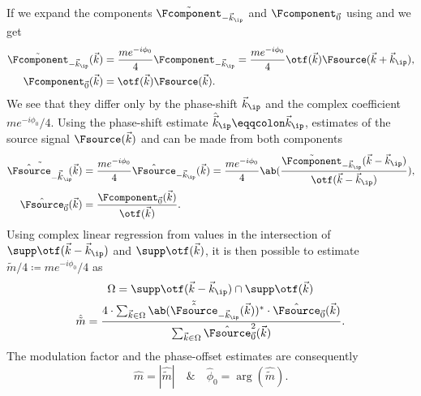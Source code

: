If we expand the components \(\tilde{\Fcomponent}_{-\vec{k}_\ip}\) and \(\Fcomponent_{\vec{0}}\) using 
     and  we get
    \begin{align*}
        \tilde{\Fcomponent}_{-\vec{k}_\ip}(\vec{k}) &= \frac{m e^{-i\phi_0}}{4} \Fcomponent_{-\vec{k}_\ip} 
            = \frac{m e^{-i\phi_0}}{4} \otf(\vec{k}) \Fsource(\vec{k} + \vec{k}_\ip), \\
        \Fcomponent_{\vec{0}}(\vec{k}) &= \otf(\vec{k}) \Fsource(\vec{k}).
    \end{align*}
We see that they differ only by the phase-shift \(\vec{k}_\ip\) and the complex coefficient \(me^{-i\phi_0}/4\).
Using the phase-shift estimate \(\hat{\vec{k}}_\ip \eqqcolon \vec{k}_\ip\), estimates of the source signal
    \(\Fsource(\vec{k})\) and can be made from both components
    \begin{align*}
        \tilde{\hat{\Fsource}_{-\vec{k}_\ip}}(\vec{k}) &= \frac{m e^{-i\phi_0}}{4}\hat{\Fsource}_{-\vec{k}_\ip}(\vec{k})
        = \frac{m e^{-i\phi_0}}{4} \ab(\frac{\tilde{\Fcomponent}_{-\vec{k}_\ip}(\vec{k} - \vec{k}_\ip)}{\otf(\vec{k} - \vec{k}_\ip)}), \\
        \hat{\Fsource}_{\vec{0}}(\vec{k}) &= \frac{\Fcomponent_{\vec{0}}(\vec{k})}{\otf(\vec{k})}.
    \end{align*}
Using complex linear regression from values in the intersection of \(\supp\otf(\vec{k} - \vec{k}_\ip)\) and
\(\supp\otf(\vec{k})\), it is then possible to estimate \(\tilde{m}/4 \coloneqq me^{-i\phi_0}/4\) as
    \begin{gather*}
        \Omega = \supp\otf(\vec{k} - \vec{k}_\ip) \cap \supp\otf(\vec{k}) \\
        \hat{\tilde{m}} =  \frac{4 \cdot\sum_{\vec{k} \in \Omega}
            \ab(\tilde{\hat{\Fsource}}_{-\vec{k}_\ip}(\vec{k}))^{*} \cdot \hat{\Fsource}_{\vec{0}}(\vec{k})}{\sum_{\vec{k} \in \Omega}
            \hat{\Fsource}_{\vec{0}}^{2}(\vec{k})}.
    \end{gather*}
The modulation factor and the phase-offset estimates are consequently
\begin{equation*}
    \hat{m} = |\hat{\tilde{m}}| \quad \& \quad \hat{\phi}_0 = \arg(\hat{\tilde{m}}).
\end{equation*}


